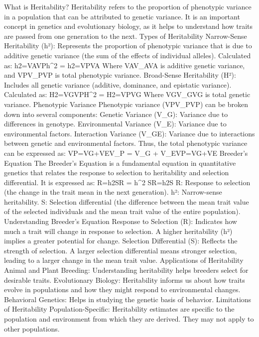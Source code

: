 What is Heritability?
Heritability refers to the proportion of phenotypic variance in a population that can be attributed to genetic variance. It is an important concept in genetics and evolutionary biology, as it helps to understand how traits are passed from one generation to the next.
Types of Heritability
Narrow-Sense Heritability (h²):
Represents the proportion of phenotypic variance that is due to additive genetic variance (the sum of the effects of individual alleles).
Calculated as: h2=VAVPh^2 = h2=VP​VA​​
Where VAV_AVA​ is additive genetic variance, and VPV_PVP​ is total phenotypic variance.
Broad-Sense Heritability (H²):
Includes all genetic variance (additive, dominance, and epistatic variance).
Calculated as: H2=VGVPH^2 = H2=VP​VG​​
Where VGV_GVG​ is total genetic variance.
Phenotypic Variance
Phenotypic variance (VPV_PVP​) can be broken down into several components:
Genetic Variance (V_G): Variance due to differences in genotype.
Environmental Variance (V_E): Variance due to environmental factors.
Interaction Variance (V_GE): Variance due to interactions between genetic and environmental factors.
Thus, the total phenotypic variance can be expressed as:
VP=VG+VEV_P = V_G + V_EVP​=VG​+VE​
Breeder's Equation
The Breeder's Equation is a fundamental equation in quantitative genetics that relates the response to selection to heritability and selection differential. It is expressed as:
R=h2SR = h^2 SR=h2S
R: Response to selection (the change in the trait mean in the next generation).
h²: Narrow-sense heritability.
S: Selection differential (the difference between the mean trait value of the selected individuals and the mean trait value of the entire population).
Understanding Breeder's Equation
Response to Selection (R):
Indicates how much a trait will change in response to selection.
A higher heritability (h²) implies a greater potential for change.
Selection Differential (S):
Reflects the strength of selection. A larger selection differential means stronger selection, leading to a larger change in the mean trait value.
Applications of Heritability
Animal and Plant Breeding: Understanding heritability helps breeders select for desirable traits.
Evolutionary Biology: Heritability informs us about how traits evolve in populations and how they might respond to environmental changes.
Behavioral Genetics: Helps in studying the genetic basis of behavior.
Limitations of Heritability
Population-Specific: Heritability estimates are specific to the population and environment from which they are derived. They may not apply to other populations.
